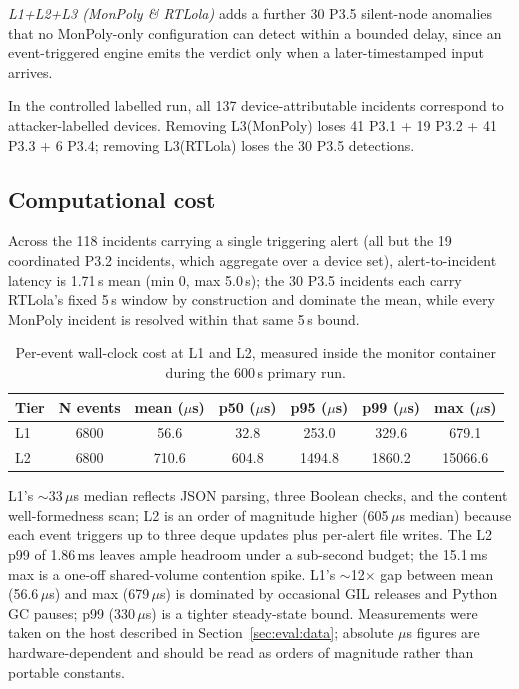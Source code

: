 \documentclass[runningheads]{llncs}
\begin{document}
\emph{L1+L2+L3
(MonPoly \& RTLola)} adds a further 30 P3.5 silent-node anomalies
that no MonPoly-only configuration can detect within a bounded delay, since an event-triggered engine emits the verdict only when a later-timestamped input arrives. 

In the controlled labelled run, all 137 device-attributable incidents correspond to attacker-labelled devices.
Removing L3(MonPoly) loses 41 P3.1 + 19 P3.2 + 41 P3.3 + 6 P3.4; removing L3(RTLola) loses the 30 P3.5
detections. 

\subsection{Computational cost}
\label{sec:eval:cost}
Across the 118 incidents carrying a single triggering alert (all but
the 19 coordinated P3.2 incidents, which aggregate over a device set),
alert-to-incident latency is 1.71\,s
mean (min 0, max 5.0\,s); the 30 P3.5 incidents each carry RTLola's fixed
5\,s window by construction and dominate the mean, while every MonPoly
incident is resolved within that same 5\,s bound.


\begin{table}[t]
\centering
\caption{Per-event wall-clock cost at L1 and L2, measured inside
the monitor container during the 600\,s primary run.}
\label{tab:timing}
\renewcommand{\arraystretch}{1.1}
\setlength{\tabcolsep}{5pt}
\footnotesize
\begin{tabular}{@{}l c c c c c c@{}}
\toprule
\textbf{Tier} & \textbf{N events} & \textbf{mean ($\mu$s)} & \textbf{p50 ($\mu$s)} & \textbf{p95 ($\mu$s)} & \textbf{p99 ($\mu$s)} & \textbf{max ($\mu$s)} \\
\midrule
L1 & 6800 & 56.6  & 32.8  & 253.0  & 329.6 & 679.1 \\
L2 & 6800 & 710.6 & 604.8 & 1494.8 & 1860.2 & 15066.6 \\
\bottomrule
\end{tabular}
\end{table}

L1's $\sim$33\,$\mu$s median reflects JSON parsing, three Boolean checks,
and the content well-formedness scan; L2 is an order of magnitude higher
(605\,$\mu$s median) because each event triggers up to three deque updates
plus per-alert file writes. The L2 p99 of 1.86\,ms leaves ample headroom
under a sub-second budget; the 15.1\,ms max is a one-off shared-volume
contention spike. L1's $\sim$12$\times$ gap between mean (56.6\,$\mu$s) and
max (679\,$\mu$s) is dominated by occasional GIL releases and Python GC
pauses; p99 (330\,$\mu$s) is a tighter steady-state bound. Measurements were taken on the host described in Section~\ref{sec:eval:data}; absolute $\mu$s figures are hardware-dependent and should be read as orders of magnitude rather than portable constants.
\end{document}
